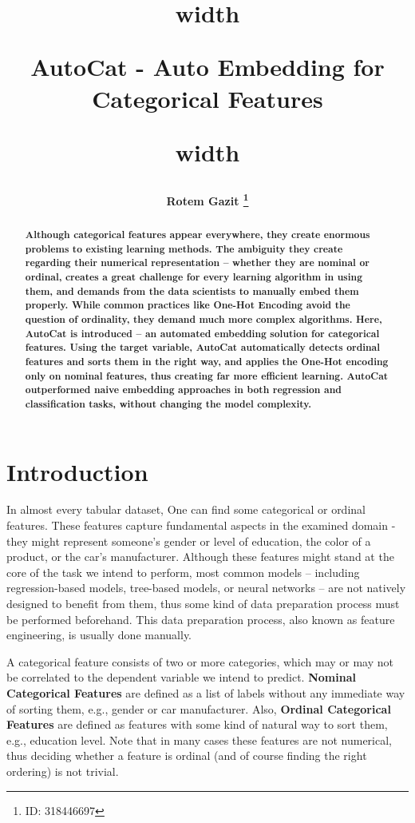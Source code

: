 \documentclass{article}
\title{
\noindent\vrule height 2.5pt width \textwidth
\begin{center}
    \bfseries AutoCat - Auto Embedding for Categorical Features
\end{center}
\noindent\vrule height 2.5pt width \textwidth
}
\author{\bfseries Rotem Gazit \thanks{ID: 318446697}}
\date{}
\begin{document}
\maketitle


\begin{abstract}
\bfseries
Although categorical features appear everywhere, they create enormous problems to existing learning methods. The ambiguity they create regarding their numerical representation -- whether they are nominal or ordinal, creates a great challenge for every learning algorithm in using them, and demands from the data scientists to manually embed them properly. While common practices like One-Hot Encoding avoid the question of ordinality, they demand much more complex algorithms. Here, AutoCat is introduced -- an automated embedding solution for categorical features. Using the target variable, AutoCat automatically detects ordinal features and sorts them in the right way, and applies the One-Hot encoding only on nominal features, thus creating far more efficient learning. AutoCat outperformed naive embedding approaches in both regression and classification tasks, without changing the model complexity.
\end{abstract}

\section{Introduction}
In almost every tabular dataset, One can find some categorical or ordinal features. These features capture fundamental aspects in the examined domain - they might represent someone’s gender or level of education, the color of a product, or the car’s manufacturer. Although these features might stand at the core of the task we intend to perform, most common models – including regression-based models, tree-based models, or neural networks – are not natively designed to benefit from them, thus some kind of data preparation process must be performed beforehand. This data preparation process, also known as feature engineering, is usually done manually.

A categorical feature consists of two or more categories, which may or may not be correlated to the dependent variable we intend to predict. \textbf{Nominal Categorical Features} are defined as a list of labels without any immediate way of sorting them, e.g., gender or car manufacturer. Also, \textbf{Ordinal Categorical Features} are defined as features with some kind of natural way to sort them, e.g., education level. Note that in many cases these features are not numerical, thus deciding whether a feature is ordinal (and of course finding the right ordering) is not trivial.
\end{document}

